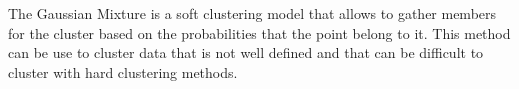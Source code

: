 \documentclass[conference]{IEEEtran}
\begin{document}
The Gaussian Mixture is a soft clustering model that allows to gather members for the cluster based on the probabilities that the point belong to it. This method can be use to cluster data that is not well defined and that can be difficult to cluster with hard clustering methods.

%
%
\end{document}
